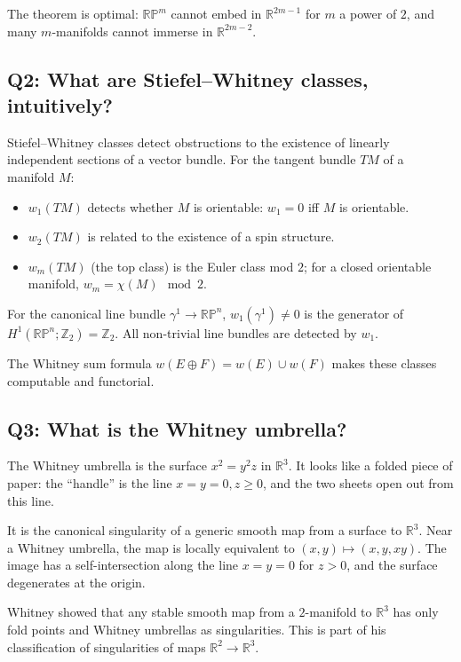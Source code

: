 The theorem is optimal: $\mathbb{RP}^m$ cannot embed in $\mathbb{R}^{2m-1}$ for $m$ a power of $2$, and many $m$-manifolds cannot immerse in $\mathbb{R}^{2m-2}$.

\subsection*{Q2: What are Stiefel--Whitney classes, intuitively?}

Stiefel--Whitney classes detect obstructions to the existence of linearly independent sections of a vector bundle. For the tangent bundle $TM$ of a manifold $M$:
\begin{itemize}
    \item $w_1(TM)$ detects whether $M$ is orientable: $w_1 = 0$ iff $M$ is orientable.
    \item $w_2(TM)$ is related to the existence of a spin structure.
    \item $w_m(TM)$ (the top class) is the Euler class mod $2$; for a closed orientable manifold, $w_m = \chi(M) \mod 2$.
\end{itemize}

For the canonical line bundle $\gamma^1 \to \mathbb{RP}^n$, $w_1(\gamma^1) \neq 0$ is the generator of $H^1(\mathbb{RP}^n; \mathbb{Z}_2) = \mathbb{Z}_2$. All non-trivial line bundles are detected by $w_1$.

The Whitney sum formula $w(E \oplus F) = w(E) \cup w(F)$ makes these classes computable and functorial.

\subsection*{Q3: What is the Whitney umbrella?}

The Whitney umbrella is the surface $x^2 = y^2 z$ in $\mathbb{R}^3$. It looks like a folded piece of paper: the ``handle'' is the line $x = y = 0, z \geq 0$, and the two sheets open out from this line.

It is the canonical singularity of a generic smooth map from a surface to $\mathbb{R}^3$. Near a Whitney umbrella, the map is locally equivalent to $(x,y) \mapsto (x, y, xy)$. The image has a self-intersection along the line $x = y = 0$ for $z > 0$, and the surface degenerates at the origin.

Whitney showed that any stable smooth map from a $2$-manifold to $\mathbb{R}^3$ has only fold points and Whitney umbrellas as singularities. This is part of his classification of singularities of maps $\mathbb{R}^2 \to \mathbb{R}^3$.

